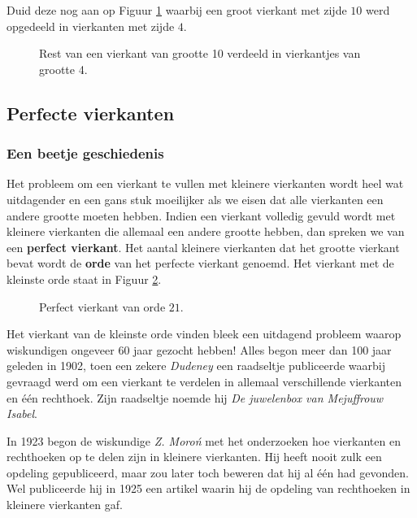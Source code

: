 Duid deze nog aan op Figuur \ref{fig:vierkant10_4x4} waarbij een groot vierkant met zijde $10$ werd opgedeeld in vierkanten met zijde $4$.

\begin{figure}[ht]
  \centering
  
  \caption{Rest van een vierkant van grootte 10 verdeeld in vierkantjes van grootte 4.}
  \label{fig:vierkant10_4x4}
\end{figure}

\newpage
\subsection{Perfecte vierkanten}

\subsubsection{Een beetje geschiedenis}

Het probleem om een vierkant te vullen met kleinere vierkanten wordt heel wat uitdagender en een gans stuk moeilijker als we eisen dat alle vierkanten een andere grootte moeten hebben. Indien een vierkant volledig gevuld wordt met kleinere vierkanten die allemaal een andere grootte hebben, dan spreken we van een {\bf perfect vierkant}. Het aantal kleinere vierkanten dat het grootte vierkant bevat wordt de {\bf orde} van het perfecte vierkant genoemd. Het vierkant met de kleinste orde staat in Figuur \ref{fig:pv21}.

\begin{figure}[ht]
  \centering
  
  \caption{Perfect vierkant van orde $21$.}
  \label{fig:pv21}
\end{figure}

Het vierkant van de kleinste orde vinden bleek een uitdagend probleem waarop wiskundigen ongeveer 60 jaar gezocht hebben! Alles begon meer dan 100 jaar geleden in 1902, toen een zekere {\it Dudeney} een raadseltje publiceerde waarbij gevraagd werd om een vierkant te verdelen in allemaal verschillende vierkanten en één rechthoek. Zijn raadseltje noemde hij {\it De juwelenbox van Mejuffrouw Isabel}.

In 1923 begon de wiskundige {\it Z. Moro\'n} met het onderzoeken hoe vierkanten en rechthoeken op te delen zijn in kleinere vierkanten. Hij heeft nooit zulk een opdeling gepubliceerd, maar zou later toch beweren dat hij al één had gevonden. Wel publiceerde hij in 1925 een artikel waarin hij de opdeling van rechthoeken in kleinere vierkanten gaf.

